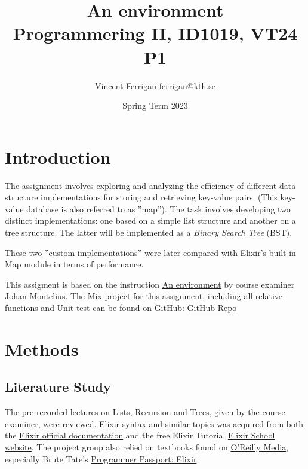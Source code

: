 \documentclass[a4paper,11pt]{article}
\begin{document}
\title{
    An environment
\\\small{Programmering II, ID1019, VT24 P1}
}
\author{Vincent Ferrigan \href{mailto:ferrigan@kth.se}{ferrigan@kth.se}}

\date{Spring Term 2023}

\maketitle

\section*{Introduction}
\label{sec:introduction}
%
%
The assignment involves exploring and analyzing the efficiency of
different data structure implementations for storing
and retrieving key-value pairs.
(This key-value database is also referred to as ''map'').
The task involves developing two distinct implementations:
one based on a simple list structure and
another on a tree structure.
The latter will be implemented as a \emph{Binary Search Tree} (BST).

These two ''custom implementations'' were later compared with
Elixir's built-in Map module in terms of performance.

This assigment is based on the instruction
\href{https://people.kth.se/~johanmon/courses/id1019/seminars/environment/environment.pdf}{An environment}
by course examiner Johan Montelius.
The Mix-project for this assignment, including all relative functions and Unit-test can be found on GitHub:
\href{https://github.com/VincentFerrigan/kth-id1019-programming-ii/tree/main/tasks/2/mymaps}{GitHub-Repo}%

\section*{Methods}
\label{sec:methods}

\subsection*{Literature Study}
\label{subsec:methods}
The pre-recorded lectures on
\href{https://canvas.kth.se/courses/44911/assignments/syllabus}{Lists, Recursion and Trees},
given by the course examiner, were reviewed.
Elixir-syntax and similar topics was acquired
from both the
\href{https://elixir-lang.org/docs.html}{Elixir official documentation}
and the free Elixir Tutorial
\href{https://elixirschool.com/en}{Elixir School
website}.
The project group also relied on textbooks found on
\href{https://learning.oreilly.com}{O'Reilly Media},
especially Brute Tate's
\href{https://learning.oreilly.com/library/view/programmer-passport-elixir/9781680509649/}{Programmer Passport: Elixir}.
\end{document}
